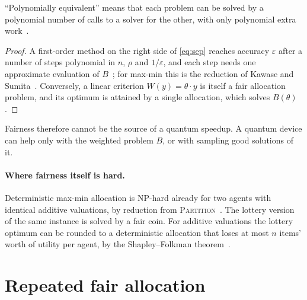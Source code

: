 \documentclass[11pt,a4paper]{article}
\begin{document}
``Polynomially equivalent'' means that each problem can be solved by a polynomial number of calls to a
solver for the other, with only polynomial extra work~\cite{garey1979computers}.

\begin{proof}
A first-order method on the right side of \eqref{eq:sep} reaches accuracy $\varepsilon$ after a
number of steps polynomial in $n$, $\rho$ and $1/\varepsilon$, and each step needs one approximate
evaluation of $B$~\cite{freund1999adaptive,arora2012multiplicative}; for max-min this is the reduction
of Kawase and Sumita~\cite{kawase2020maxmin}. Conversely, a linear criterion $W(y)=\theta\cdot y$ is
itself a fair allocation problem, and its optimum is attained by a single allocation, which solves
$B(\theta)$.
\end{proof}

Fairness therefore cannot be the source of a quantum speedup. A quantum device can help only with the
weighted problem $B$, or with sampling good solutions of it.

\paragraph{Where fairness itself is hard.} Deterministic max-min allocation is NP-hard already for two
agents with identical additive valuations, by reduction from
\textsc{Partition}~\cite{karp1972reducibility,garey1979computers}. The lottery version of the same
instance is solved by a fair coin. For additive valuations the lottery optimum can be rounded to a
deterministic allocation that loses at most $n$ items' worth of utility per agent, by the
Shapley--Folkman theorem~\cite{starr1969quasi}.

\section{Repeated fair allocation}
\end{document}
